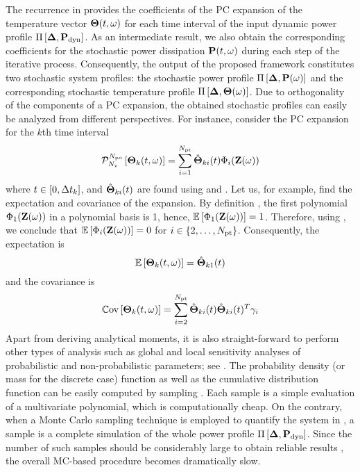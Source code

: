 The recurrence in  provides the coefficients of the PC expansion of the temperature vector ${\boldsymbol\Theta}(t, \omega)$ for each time interval of the input dynamic power profile $\prof{\mP_\dyn}$. As an intermediate result, we also obtain the corresponding coefficients for the stochastic power dissipation $\mathbf{P}(t, \omega)$ during each step of the iterative process. Consequently, the output of the proposed framework constitutes two stochastic system profiles: the stochastic power profile $\prof{\mP(\o)}$ and the corresponding stochastic temperature profile $\Pi\left[\boldsymbol{\Delta}, {\boldsymbol\Theta}(\omega)\right]$. Due to orthogonality of the components of a PC expansion, the obtained stochastic profiles can easily be analyzed from different perspectives. For instance, consider the PC expansion for the $k$th time interval
\begin{equation} \elabel{pc-k}
  \oPC{\vars}{\pcorder}{\vTO_k(\t, \o)} = \sum_{i = 1}^{\pcterms} \pcc{\vTO}_{ki}(\t) \pcb_i(\vZ(\o))
\end{equation}
where $t \in [0, \Delta t_k]$, and $\hat{{\boldsymbol\Theta}}_{ki}(t)$ are found using  and . Let us, for example, find the expectation and covariance of the expansion. By definition \cite{xiu2002}, the first polynomial $\Phi_1(\mathbf{Z}(\omega))$ in a polynomial basis is 1, hence, $\mathbb{E}\left[\Phi_1(\mathbf{Z}(\omega))\right] = 1$. Therefore, using , we conclude that $\mathbb{E}\left[\Phi_i(\mathbf{Z}(\omega))\right] = 0$ for $i \in \{ 2, \dotsc, {N_\text{pt}} \}$. Consequently, the expectation is
\[
  \mathbb{E}\left[{\boldsymbol\Theta}_k(t, \omega)\right] = \hat{{\boldsymbol\Theta}}_{k1}(t)
\]
and the covariance is
\[
  \mathbb{C}\text{ov}\left[{\boldsymbol\Theta}_k(t, \omega)\right] = \sum_{i = 2}^{{N_\text{pt}}} \hat{{\boldsymbol\Theta}}_{ki}(t) \hat{{\boldsymbol\Theta}}_{ki}(t)^T \gamma_i
\]
Apart from deriving analytical moments, it is also straight-forward to perform other types of analysis such as global and local sensitivity analyses of probabilistic and non-probabilistic parameters; see \cite{eldred2009, maitre2010}. The probability density (or mass for the discrete case) function as well as the cumulative distribution function can be easily computed by sampling . Each sample is a simple evaluation of a multivariate polynomial, which is computationally cheap. On the contrary, when a Monte Carlo sampling technique is employed to quantify the system in , a sample is a complete simulation of the whole power profile $\prof{\mP_\dyn}$. Since the number of such samples should be considerably large to obtain reliable results \cite{xiu2009}, the overall MC-based procedure becomes dramatically slow.

